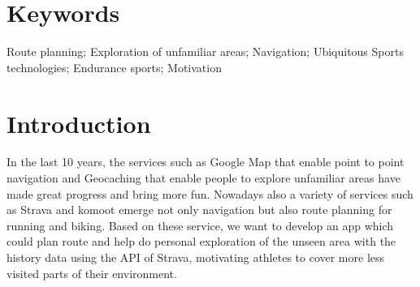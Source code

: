 \documentclass{sigchi}
\begin{document}
\section{Keywords}
 Route planning;
 Exploration of unfamiliar areas;
 Navigation;
 Ubiquitous Sports technologies; 
 Endurance sports;
 Motivation

\section{Introduction}
In the last 10 years, the services such as Google Map  that enable point to point navigation and  Geocaching that enable people to explore unfamiliar areas have made great progress and bring more fun. Nowadays also a variety of services such as Strava and komoot emerge not only navigation but also route planning for running and biking. Based on these service, we want to develop an app which could  plan route and help do personal exploration of the unseen area with the history data using the API of Strava, motivating  athletes to cover more less visited parts of their environment.
\end{document}
